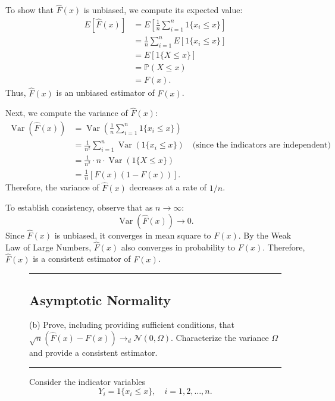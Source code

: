 \documentclass{article}
\newenvironment{colorparagraph}[1]{\par\color{#1}}{\par}
\begin{document}
To show that \( \hat{F}(x) \) is unbiased, we compute its expected value:
\[
\begin{aligned}
E[\hat{F}(x)] &= E\left[ \frac{1}{n} \sum_{i=1}^n 1\{ x_i \leq x \} \right] \\
&= \frac{1}{n} \sum_{i=1}^n E[1\{ x_i \leq x \}] \\
&= E[1\{ X \leq x \}] \\
&= \mathbb{P}(X \leq x) \\
&= F(x).
\end{aligned}
\]
Thus, \( \hat{F}(x) \) is an unbiased estimator of \( F(x) \).

Next, we compute the variance of \( \hat{F}(x) \):
\[
\begin{aligned}
\operatorname{Var}(\hat{F}(x)) &= \operatorname{Var}\left( \frac{1}{n} \sum_{i=1}^n 1\{ x_i \leq x \} \right) \\
&= \frac{1}{n^2} \sum_{i=1}^n \operatorname{Var}(1\{ x_i \leq x \}) \quad \text{(since the indicators are independent)} \\
&= \frac{1}{n^2} \cdot n \cdot \operatorname{Var}(1\{ X \leq x \}) \\
&= \frac{1}{n} \left[ F(x)(1 - F(x)) \right].
\end{aligned}
\]
Therefore, the variance of \( \hat{F}(x) \) decreases at a rate of \( 1/n \).

To establish consistency, observe that as \( n \to \infty \):
\[
\operatorname{Var}(\hat{F}(x)) \to 0.
\]
Since \( \hat{F}(x) \) is unbiased, it converges in mean square to \( F(x) \). By the Weak Law of Large Numbers, \( \hat{F}(x) \) also converges in probability to \( F(x) \). Therefore, \( \hat{F}(x) \) is a consistent estimator of \( F(x) \).

\begin{figure}[H]
\begin{colorparagraph}{questioncolor}
\label{q2b}
\rule{\textwidth}{0.5pt}
\subsection{Asymptotic Normality}
(b) Prove, including providing sufficient conditions, that \( \sqrt{n}(\hat{F}(x) - F(x)) \to_d \mathcal{N}(0, \Omega) \).
Characterize the variance \( \Omega \) and provide a consistent estimator.

\rule{\textwidth}{0.5pt}
\end{colorparagraph}

Consider the indicator variables
\[
  Y_i = 1\{ x_i \leq x \}, \quad i = 1, 2, \dots, n.
  \]
\end{figure}
\end{document}
